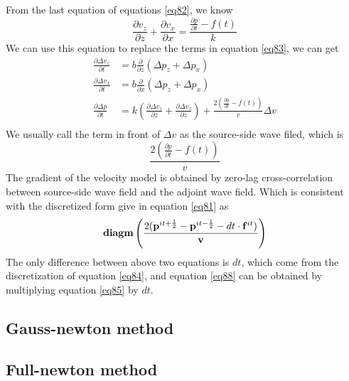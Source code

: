 \documentclass[revised,endfloat]{geophysics}
\begin{document}
From the last equation of equations \ref{eq82}, we know
\begin{equation}
\frac{\partial v_z}{\partial z} +  \frac{\partial v_x}{\partial x}  = \frac{\frac{\partial p}{\partial t} - f(t)}{k}
\label{eq85}
\end{equation}
We can use this equation to replace the terms in equation \ref{eq83}, we can get
\begin{equation}
\begin{split}
\frac{\partial \Delta v_z}{\partial t} &= b \frac{\partial }{\partial z} \left(\Delta p_z  + \Delta p_x \right) \\
\frac{\partial \Delta v_x}{\partial t} &=  b \frac{\partial }{\partial x} \left(\Delta p_z  + \Delta p_x \right) \\
\frac{\partial  \Delta p}{\partial t} &= k \left( \frac{\partial  \Delta v_z}{\partial z} +  \frac{\partial  \Delta v_z}{\partial z} \right) + \frac{2\left( \frac{\partial p}{\partial t} - f(t)\right)}{v} \Delta v  \\
\end{split}
\label{eq86}
\end{equation}
We usually call the term in front of $\Delta v$ as the source-side wave filed, which is 
\begin{equation}
\frac{2\left( \frac{\partial p}{\partial t} - f(t)\right)}{v}
\label{eq87}
\end{equation}
The gradient of the velocity model is obtained by zero-lag cross-correlation between source-side wave field and the adjoint wave field.
Which is consistent with the discretized form give in equation \ref{eq81} as
\begin{equation}	
{\bf diagm} \left( \frac{2({\bf p}^{it+\frac{1}{2}} - {\bf p}^{it-\frac{1}{2}}  - dt \cdot {\bf f}^{it})}{{\bf v}} \right) 
\label{eq88}
\end{equation}
The only difference between above two equations is $dt$, which come from the discretization of equation \ref{eq84}, and equation \ref{eq88} can be obtained by multiplying equation \ref{eq85} by $dt$. 

\subsection{Gauss-newton method}

\subsection{Full-newton method}
\end{document}
